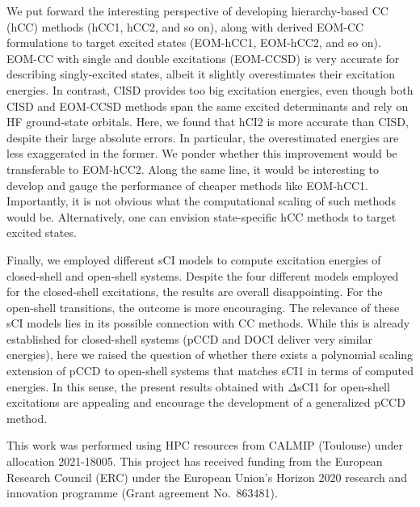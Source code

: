 \documentclass[aip,jcp,reprint,noshowkeys,superscriptaddress]{revtex4-1}
\begin{document}
We put forward the interesting perspective of developing hierarchy-based CC (hCC) methods (hCC1, hCC2, and so on),
along with derived EOM-CC formulations to target excited states (EOM-hCC1, EOM-hCC2, and so on).
EOM-CC with single and double excitations (EOM-CCSD) \cite{Rowe_1968,Monkhorst_1977,Koch_1990,Stanton_1993}
is very accurate for describing singly-excited states, \cite{Loos_2018,Loos_2020,Loos_2020a} albeit it slightly overestimates their excitation energies.
In contrast, CISD provides too big excitation energies, \cite{Koch_1990,Kossoski_2023}
even though both CISD and EOM-CCSD methods span the same excited determinants and rely on HF ground-state orbitals.
Here, we found that hCI2 is more accurate than CISD, despite their large absolute errors. In particular, the overestimated energies are less exaggerated in the former.
We ponder whether this improvement would be transferable to EOM-hCC2.
Along the same line, it would be interesting to develop and gauge the performance of cheaper methods like EOM-hCC1.
Importantly, it is not obvious what the computational scaling of such methods would be.
Alternatively, one can envision state-specific hCC methods to target excited states.

Finally, we employed different sCI models to compute excitation energies of closed-shell and open-shell systems.
Despite the four different models employed for the closed-shell excitations, the results are overall disappointing.
For the open-shell transitions, the outcome is more encouraging.
The relevance of these sCI models lies in its possible connection with CC methods.
While this is already established for closed-shell systems (pCCD and DOCI deliver very similar energies), \cite{Bytautas_2011,Allen_1962,Smith_1965,Veillard_1967,Kossoski_2021,Marie_2021}
here we raised the question of whether there exists a polynomial scaling extension of pCCD to open-shell systems that matches sCI1 in terms of computed energies.
In this sense, the present results obtained with $\Delta$sCI1 for open-shell excitations are appealing and encourage the development of a generalized pCCD method.


\begin{acknowledgements}
This work was performed using HPC resources from CALMIP (Toulouse) under allocation 2021-18005.
This project has received funding from the European Research Council (ERC) under the European Union's Horizon 2020 research and innovation programme (Grant agreement No.~863481).
\end{acknowledgements}
\end{document}
